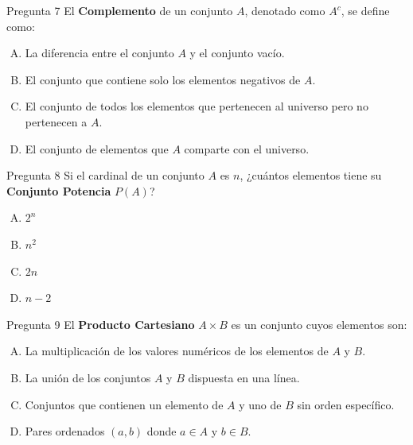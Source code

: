 \documentclass[aspectratio=169]{beamer}
\begin{document}
\begin{frame}
\begin{block}{Pregunta 7}
El \textbf{Complemento} de un conjunto \(A\), denotado como \(A^{c}\), se define como:

\begin{enumerate}[A)]
    \item La diferencia entre el conjunto \(A\) y el conjunto vacío.
    \item El conjunto que contiene solo los elementos negativos de \(A\).
    \item El conjunto de todos los elementos que pertenecen al universo pero no pertenecen a \(A\).
    \item El conjunto de elementos que \(A\) comparte con el universo.
\end{enumerate}
\end{block}
\end{frame}

\begin{frame}
\begin{block}{Pregunta 8}
Si el cardinal de un conjunto \(A\) es \(n\), ¿cuántos elementos tiene su \textbf{Conjunto Potencia} \(P(A)\)?

\begin{enumerate}[A.]
    \item \(2^{n}\)
    \item \(n^{2}\)
    \item \(2n\)
    \item \(n-2\) 
\end{enumerate}


\end{block}
\end{frame}


\begin{frame}
\begin{block}{Pregunta 9}
El \textbf{Producto Cartesiano} \(A \times B\) es un conjunto cuyos elementos son:

\begin{enumerate}[A.]
    \item La multiplicación de los valores numéricos de los elementos de \(A\) y \(B\).
    \item La unión de los conjuntos \(A\) y \(B\) dispuesta en una línea.
    \item Conjuntos que contienen un elemento de \(A\) y uno de \(B\) sin orden específico.
    \item Pares ordenados \((a,b)\) donde \(a \in A\) y \(b \in B\).
\end{enumerate}
\end{block}
\end{frame}
\end{document}
